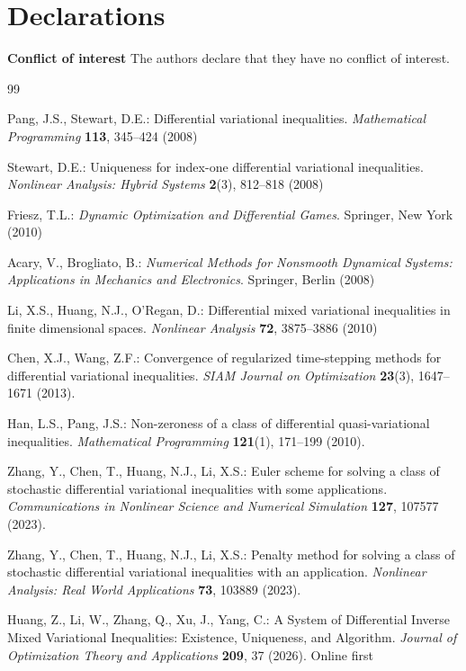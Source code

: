 \documentclass[sn-basic,Numbered]{sn-jnl}
\theoremstyle{thmstyleone}%
\begin{document}
\section*{Declarations}
\textbf{Conflict of interest} The authors declare that they have no conflict of interest.

\begin{thebibliography}{99}

Pang, J.S., Stewart, D.E.: Differential variational inequalities. \emph{Mathematical Programming} \textbf{113}, 345--424 (2008)

Stewart, D.E.: Uniqueness for index-one differential variational inequalities. \emph{Nonlinear Analysis: Hybrid Systems} \textbf{2}(3), 812--818 (2008)

Friesz, T.L.: \emph{Dynamic Optimization and Differential Games}. Springer, New York (2010)

Acary, V., Brogliato, B.: \emph{Numerical Methods for Nonsmooth Dynamical Systems: Applications in Mechanics and Electronics}. Springer, Berlin (2008)

Li, X.S., Huang, N.J., O'Regan, D.: Differential mixed variational inequalities in finite dimensional spaces. \emph{Nonlinear Analysis} \textbf{72}, 3875--3886 (2010)

Chen, X.J., Wang, Z.F.: Convergence of regularized time-stepping methods for differential variational inequalities. \emph{SIAM Journal on Optimization} \textbf{23}(3), 1647--1671 (2013). 

Han, L.S., Pang, J.S.: Non-zeroness of a class of differential quasi-variational inequalities. \emph{Mathematical Programming} \textbf{121}(1), 171--199 (2010). 

Zhang, Y., Chen, T., Huang, N.J., Li, X.S.: Euler scheme for solving a class of stochastic differential variational inequalities with some applications. \emph{Communications in Nonlinear Science and Numerical Simulation} \textbf{127}, 107577 (2023). 

Zhang, Y., Chen, T., Huang, N.J., Li, X.S.: Penalty method for solving a class of stochastic differential variational inequalities with an application. \emph{Nonlinear Analysis: Real World Applications} \textbf{73}, 103889 (2023). 

Huang, Z., Li, W., Zhang, Q., Xu, J., Yang, C.: A System of Differential Inverse Mixed Variational Inequalities: Existence, Uniqueness, and Algorithm. \emph{Journal of Optimization Theory and Applications} \textbf{209}, 37 (2026). Online first


\end{thebibliography}
\end{document}
